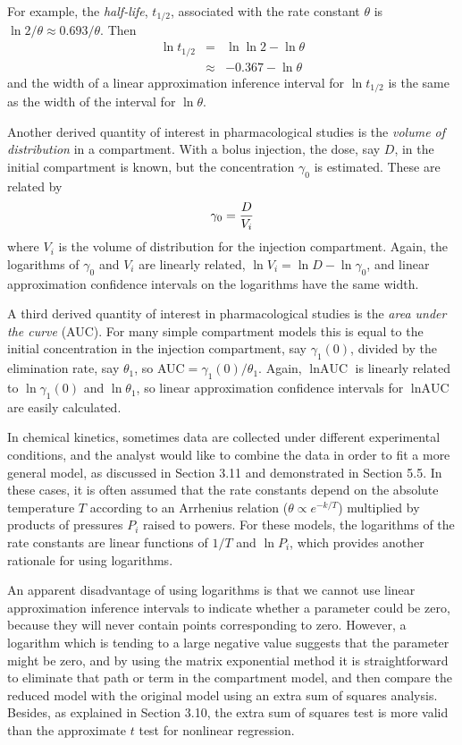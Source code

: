 For example, the {\em half-life}, $t_{{1/2}}$, associated with the
rate constant $\theta$ is $\ln2 / \theta  \approx  0.693 / \theta$.
Then
\begin{eqnarray}
\ln t_{{1/2}}&=&\ln\ln2  - \ln\theta\\
&\approx&-0.367 - \ln\theta
\end{eqnarray}
and the width of a linear approximation inference interval for
$\ln t_{{1/2}}$ is the same as the width of the
interval for $\ln\theta $.

Another derived quantity of interest in pharmacological studies
is the %
{\em volume of distribution }
in a compartment.
With a bolus injection, the dose, say $D$, in the initial
compartment is known, but the concentration $\gamma_0 $ is
estimated.
These are related by
$$
\gamma_0 = { D   \over  V_i }
$$
where $V_{i}$ is the volume of distribution for the injection
compartment.
Again, the logarithms of $\gamma_0 $ and $V_{i}$ are
linearly related,
$\ln V_i =\ln D -\ln\gamma_0 $,
and linear approximation confidence intervals on the logarithms have
the same width.

A third derived quantity of interest in pharmacological studies is
the {\em area under the curve\/} (AUC).
For many simple compartment models this is equal to the initial
concentration in the injection compartment, say $\gamma_1 ( 0 )$,
divided by the elimination rate, say $\theta_{1}$, so
AUC$ = { \gamma_1 ( 0 )} / {\theta_1}$.
Again, $\ln\mbox{AUC}$  is linearly related to $\ln\gamma_1 ( 0 ) $ and
$\ln\theta_1 $, so linear approximation confidence intervals for
$\ln\mbox{AUC}$ are easily calculated.

In chemical kinetics, sometimes data are collected
under different experimental conditions, and the analyst would
like to combine the data in order to fit a more general model,
as discussed in Section 3.11 and demonstrated in Section 5.5.
In these cases, it is often assumed that the rate constants
depend on the absolute temperature $T$ according to an Arrhenius
relation ($\theta \propto e^{-k/T} $) multiplied by products of
pressures $P_{i}$ raised to powers.
For these models, the logarithms of the rate constants are
linear functions of $1/T$ and $\ln P_i$,
which provides another rationale for using logarithms.

An apparent disadvantage of using logarithms is that we cannot use
linear approximation inference intervals to indicate whether a
parameter could be zero, because they
will never contain points corresponding to zero.
However, a logarithm which is tending to a large negative value
suggests that the parameter might be zero, and by using the matrix
exponential method it is
straightforward to eliminate that path or term in the compartment model,
and then compare the reduced model with the original model using an
extra sum of squares analysis.
Besides, as explained in Section 3.10, the extra sum of squares test
is more valid than the approximate $t$ test for nonlinear
regression.


